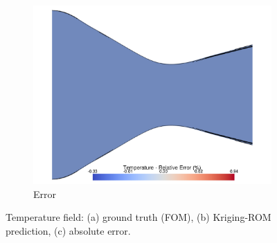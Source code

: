 \documentclass[tg, EN]{ufabcFHZh_tg}
\begin{document}
\begin{figure}[H]
\begin{subfigure}[b]{0.32\textwidth}
        \includegraphics[width=\textwidth]{Figuras/kriging_error_temperature.pdf}
        \caption{Error}
    \end{subfigure}
    \caption{Temperature field: (a) ground truth (FOM), (b) Kriging-ROM prediction, (c) absolute error.}
    \label{fig:kriging_reconstruction_temperature}
\end{figure}
\end{document}
